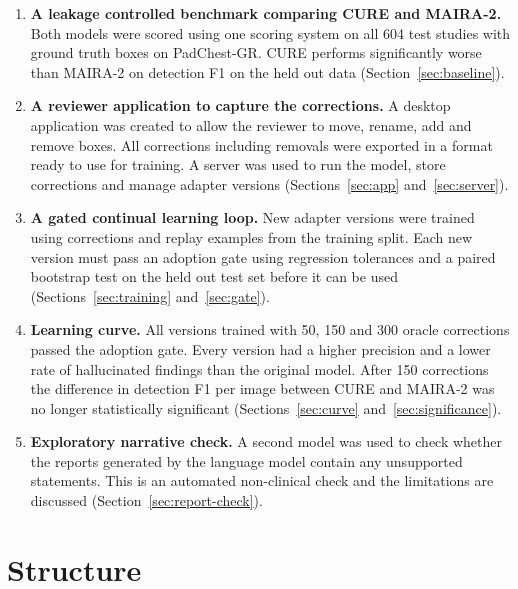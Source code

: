 \begin{enumerate}[label=(\arabic*), leftmargin=*, itemsep=4pt]
  \item \textbf{A leakage controlled benchmark comparing CURE and MAIRA-2.} Both
        models were scored using one scoring system on all 604 test studies with ground
        truth boxes on PadChest-GR. CURE performs significantly worse than MAIRA-2 on
        detection F1 on the held out data (Section~\ref{sec:baseline}).
  \item \textbf{A reviewer application to capture the corrections.} A desktop
        application was created to allow the reviewer to move, rename, add and remove
        boxes. All corrections including removals were exported in a format ready to use
        for training. A server was used to run the model, store corrections and manage
        adapter versions (Sections~\ref{sec:app} and~\ref{sec:server}).
  \item \textbf{A gated continual learning loop.} New adapter versions were trained
        using corrections and replay examples from the training split. Each new version
        must pass an adoption gate using regression tolerances and a paired bootstrap
        test on the held out test set before it can be used
        (Sections~\ref{sec:training} and~\ref{sec:gate}).
  \item \textbf{Learning curve.} All versions trained with 50, 150 and 300 oracle
        corrections passed the adoption gate. Every version had a higher precision and a
        lower rate of hallucinated findings than the original model. After 150
        corrections the difference in detection F1 per image between CURE and MAIRA-2
        was no longer statistically significant (Sections~\ref{sec:curve}
        and~\ref{sec:significance}).
  \item \textbf{Exploratory narrative check.} A second model was used to check whether
        the reports generated by the language model contain any unsupported statements.
        This is an automated non-clinical check and the limitations are discussed
        (Section~\ref{sec:report-check}).
\end{enumerate}

\section{Structure}
\label{sec:structure}

